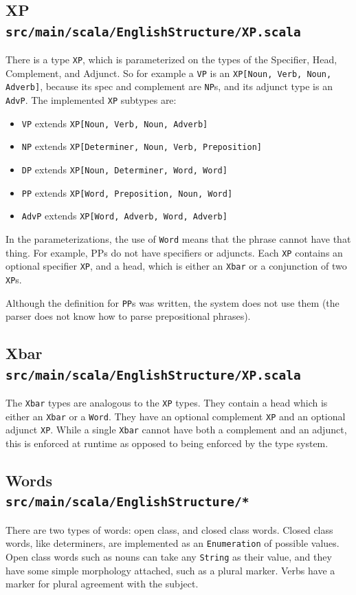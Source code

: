 \documentclass[a4paper, 11pt]{article}
\begin{document}
\subsection[XP]{XP\\
	\normalsize \texttt{src/main/scala/EnglishStructure/XP.scala}}
There is a type \texttt{XP}, which is parameterized on the types of the Specifier, Head, Complement, and Adjunct. So for example a \texttt{VP} is an \texttt{XP[Noun, Verb, Noun, Adverb]}, because its spec and complement are \texttt{NP}s, and its adjunct type is an \texttt{AdvP}. The implemented \texttt{XP} subtypes are:
\begin{itemize}
\item \texttt{VP} extends \texttt{XP[Noun, Verb, Noun, Adverb]}
\item \texttt{NP} extends \texttt{XP[Determiner, Noun, Verb, Preposition]}
\item \texttt{DP} extends \texttt{XP[Noun, Determiner, Word, Word]}
\item \texttt{PP} extends \texttt{XP[Word, Preposition, Noun, Word]}
\item \texttt{AdvP} extends \texttt{XP[Word, Adverb, Word, Adverb]}
\end{itemize}

In the parameterizations, the use of \texttt{Word} means that the phrase cannot have that thing. For example, PPs do not have specifiers or adjuncts. Each \texttt{XP} contains an optional specifier \texttt{XP}, and a head, which is either an \texttt{Xbar} or a conjunction of two \texttt{XP}s.

Although the definition for \texttt{PP}s was written, the system does not use them (the parser does not know how to parse prepositional phrases).

\subsection[X-bar]{Xbar\\
	\normalsize \texttt{src/main/scala/EnglishStructure/XP.scala}}
The \texttt{Xbar} types are analogous to the \texttt{XP} types. They contain a head which is either an \texttt{Xbar} or a \texttt{Word}. They have an optional complement \texttt{XP} and an optional adjunct \texttt{XP}. While a single \texttt{Xbar} cannot have both a complement and an adjunct, this is enforced at runtime as opposed to being enforced by the type system.

\subsection[Words]{Words\\
	\normalsize \texttt{src/main/scala/EnglishStructure/*}}
There are two types of words: open class, and closed class words. Closed class words, like determiners, are implemented as an \texttt{Enumeration} of possible values. Open class words such as nouns can take any \texttt{String} as their value, and they have some simple morphology attached, such as a plural marker. Verbs have a marker for plural agreement with the subject.
\end{document}
